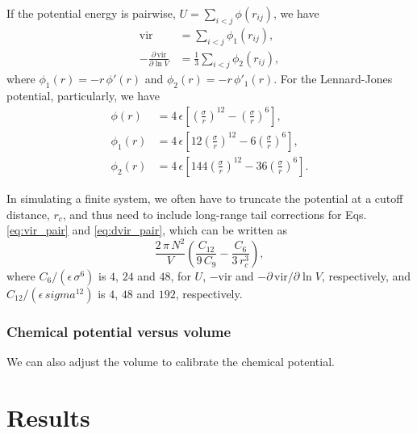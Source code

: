 \documentclass[reprint]{revtex4-1}
\begin{document}
If the potential energy is pairwise,
$U = \sum_{i < j} \phi(r_{ij})$,
we have
%
\begin{align*}
  \mathrm{vir}
  &=
  \sum_{i < j} \phi_1(r_{ij}),
  \\
  -\frac{ \partial \, \mathrm{vir} }
        { \partial \ln V }
  &=
  \frac{1}{3}
  \sum_{i < j} \phi_2(r_{ij}),
\end{align*}
%
where $\phi_1(r) = - r \, \phi'(r)$
and $\phi_2(r) = -r \, \phi'_1(r)$.
%
For the Lennard-Jones potential, particularly, we have
%
\begin{align*}
  \phi(r)
  &=
  4 \, \epsilon
  \left[
    \left( \frac{\sigma}{r} \right)^{12}
    -
    \left( \frac{\sigma}{r} \right)^{6}
  \right]
  ,
  \\
  \phi_1(r)
  &=
  4 \, \epsilon
  \left[
    12
    \left( \frac{\sigma}{r} \right)^{12}
    -
    6
    \left( \frac{\sigma}{r} \right)^{6}
  \right]
  ,
  \\
  \phi_2(r)
  &=
  4 \, \epsilon
  \left[
    144
    \left( \frac{\sigma}{r} \right)^{12}
    -
    36
    \left( \frac{\sigma}{r} \right)^{6}
  \right]
  .
\end{align*}

In simulating a finite system,
we often have to truncate the potential at a cutoff distance,
$r_c$, and thus need to include long-range tail corrections
for Eqs. \eqref{eq:vir_pair} and \eqref{eq:dvir_pair},
which can be written as
%
$$
  \frac{ 2 \, \pi \, N^2 } { V }
  \left(
    \frac{ C_{12} } { 9 \, C_9 }
    -
    \frac{ C_6 } { 3 \, r_c^3 }
  \right)
  ,
$$
%
where $C_6/(\epsilon \, \sigma^6)$ is $4$, $24$ and $48$,
for $U$, $-\mathrm{vir}$ and $-\partial\,\mathrm{vir}/\partial \ln V$,
respectively,
and $C_{12}/(\epsilon \, sigma^{12})$ is
$4$, $48$ and $192$, respectively.




\subsubsection{Chemical potential versus volume}

We can also adjust the volume to calibrate the chemical potential.
%


%




\section{Results}
\end{document}
